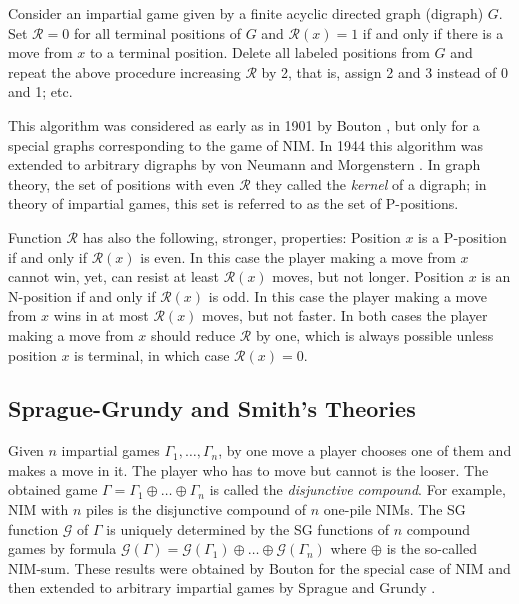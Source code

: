 \documentclass{article}
\theoremstyle{definition}
\def\G{\mathcal{G}}
\def\R{\mathcal{R}}
\begin{document}
Consider an impartial game 
given by a finite acyclic directed graph 
(digraph)  $G$.  
Set  $\R = 0$  for all terminal positions 
of  $G$  and  
$\R(x) = 1$  if and only if 
there is a move from $x$ to a terminal position.  
Delete all labeled positions from  $G$  and 
repeat the above procedure increasing  $\R$  by 2,  
that is, assign 2 and 3  instead of  0 and 1; etc. 

This algorithm was considered 
as early as in 1901 by Bouton \cite{Bou901},  
but only for a special graphs 
corresponding to the game of NIM. 
In 1944 this algorithm was extended to 
arbitrary digraphs by von Neumann and Morgenstern \cite{NM44}. 
In graph theory, the set of positions with even  $\R$  
they called the {\em kernel} of a digraph; 
in theory of impartial games, this set 
is referred to as the set of  P-positions. 

Function $\R$ has also the following, stronger, properties: 
Position $x$  is a P-position if and only if  $\R(x)$  is even. 
In this case the player making a move from  $x$  cannot win, yet,   
can resist at least $\R(x)$  moves, but not longer. 
Position  $x$  is an N-position if and only if  $\R(x)$  is odd.  
In this case the player making a move from  $x$ wins in at most 
$\R(x)$ moves, but not faster. 
In both cases the player making a move from   $x$  should  
reduce $\R$  by one, which is always possible
unless position  $x$  is terminal,  
in which case  $\R(x) = 0$.

\subsection{Sprague-Grundy and Smith's Theories}  
\label{ss03}
Given $n$ impartial games 
$\Gamma_1, \dots, \Gamma_n$, 
by one move a player chooses one of them 
and makes a move in it. 
The player who has to move but cannot is the looser. 
The obtained game  
$\Gamma = \Gamma_1 \oplus \dots \oplus \Gamma_n$  
is called the {\em disjunctive compound}. 
For example, NIM with $n$ piles 
is the disjunctive compound of $n$  one-pile NIMs. 
The SG function $\G$ of $\Gamma$ is uniquely determined 
by the SG functions of $n$ compound games by formula 
$\G(\Gamma) = \G(\Gamma_1) \oplus \dots \oplus \G(\Gamma_n)$ 
where $\oplus$  is the so-called NIM-sum. 
These results were obtained by Bouton 
\cite{Bou901}  for the special case of NIM and 
then extended to arbitrary impartial games 
by Sprague \cite{Spr36} and Grundy \cite{Gru39}. 

\medskip
\end{document}
